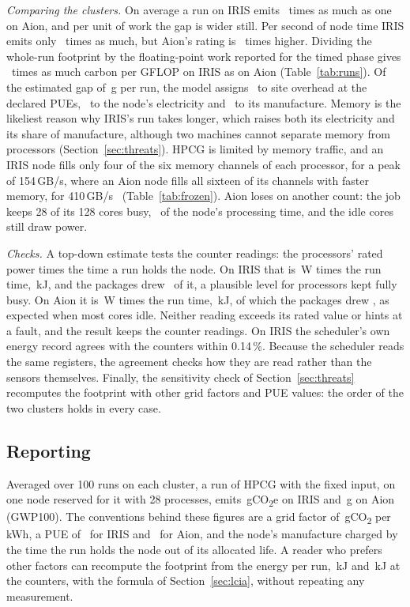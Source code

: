\documentclass[conference,a4paper]{IEEEtran}
\begin{document}
\emph{Comparing the clusters.} On average a run on IRIS emits \GapRatio\ times
as much as one on Aion, and per unit of work the gap is wider still. Per second of node
time IRIS emits only \PerSecondRatio\ times as much, but Aion's rating is
\RatingRatio\ times higher. Dividing the whole-run footprint by the floating-point
work reported for the timed phase gives \GapRatioWork\ times as much carbon per
GFLOP on IRIS as on Aion (Table~\ref{tab:runs}). Of the estimated gap of
\Gap\,g per run, the model assigns \GapShareSite\ to site overhead at the
declared PUEs, \GapShareNode\ to the node's electricity and \GapShareEmb\ to its
manufacture. Memory is the likeliest
reason why IRIS's run takes longer, which raises both its electricity and its
share of manufacture, although two machines cannot separate memory from
processors (Section~\ref{sec:threats}). HPCG is limited by memory traffic, and an
IRIS node fills only four
of the six memory channels of each processor, for a peak of 154\,GB/s, where an
Aion node fills all sixteen of its channels with faster memory, for
410\,GB/s~\cite{ulhpc-iris,ulhpc-aion} (Table~\ref{tab:frozen}). Aion loses on
another count: the job keeps 28 of its 128 cores busy, \AionBusy\ of the node's
processing time, and the idle cores still draw power.

\emph{Checks.} A top-down estimate tests the counter readings: the processors'
rated power times the time a run holds the node. On IRIS that is
\IrisTdp\,W times the run time, \IrisTopDown\,kJ, and the packages drew
\IrisPkgOverTop\ of it, a plausible level for processors kept fully busy. On
Aion it is \AionTdp\,W times the run time, \AionTopDown\,kJ, of which the
packages drew \AionPkgOverTop, as expected when most cores idle. Neither reading
exceeds its rated value or hints at a fault, and the result keeps the counter
readings. On IRIS the scheduler's own energy record agrees with the counters
within 0.14\,\%. Because the scheduler reads the same registers, the agreement
checks how they are read rather than the sensors themselves. Finally, the sensitivity check of
Section~\ref{sec:threats} recomputes the footprint with other grid factors and
PUE values: the order of the two clusters holds in every case.

\subsection{Reporting}\label{sec:reporting}

Averaged over 100 runs on each cluster, a run of HPCG with the fixed input, on
one node reserved for it with 28 processes, emits \IrisGrams\,gCO\textsubscript{2}e
on IRIS and \AionGrams\,g on Aion (GWP100). The conventions behind
these figures are a grid factor of \Grid\,gCO\textsubscript{2} per kWh, a PUE of
\IrisPue\ for IRIS and \AionPue\ for Aion, and the node's manufacture charged by the time
the run holds the node out of its allocated life. A reader who prefers other
factors can recompute the footprint from the energy per run, \IrisEnergy\,kJ and
\AionEnergy\,kJ at the counters, with the formula of Section~\ref{sec:lcia},
without repeating any measurement.
\end{document}
